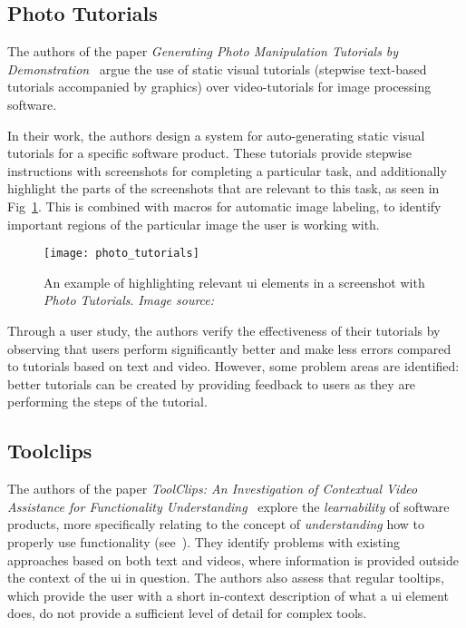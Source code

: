 \subsection{Photo Tutorials}
\label{sec:photo_tutorials}
The authors of the paper \emph{Generating Photo Manipulation Tutorials by Demonstration}~\cite{grabler:photo_tutorials} argue the use of static visual tutorials (stepwise text-based tutorials accompanied by graphics) over video-tutorials for image processing software.

\noindent
In their work, the authors design a system for auto-generating static visual tutorials for a specific software product. These tutorials provide stepwise instructions with screenshots for completing a particular task, and additionally highlight the parts of the screenshots that are relevant to this task, as seen in Fig~\ref{fig:photo_tutorials}. This is combined with macros for automatic image labeling, to identify important regions of the particular image the user is working with.

\begin{figure}[htp]
	\centering
	\texttt{[image: photo\_tutorials]}
	\caption[\emph{Photo Tutorials} example]{An example of highlighting relevant \gls{ui} elements in a screenshot with \emph{Photo Tutorials}. \emph{Image source:~\cite{grabler:photo_tutorials}}}
	\label{fig:photo_tutorials}
\end{figure}

\noindent
Through a user study, the authors verify the effectiveness of their tutorials by observing that users perform significantly better and make less errors compared to tutorials based on text and video. However, some problem areas are identified: better tutorials can be created by providing feedback to users as they are performing the steps of the tutorial.

\subsection{Toolclips}
\label{sec:toolclips}
The authors of the paper \emph{ToolClips: An Investigation of Contextual
Video Assistance for Functionality Understanding}~\cite{grossman:toolclips} explore the \emph{learnability} of software products, more specifically relating to the concept of \emph{understanding} how to properly use functionality (see~\cite{grossman:software_learnability}). They identify problems with existing approaches based on both text and videos, where information is provided outside the context of the \gls{ui} in question. The authors also assess that regular tooltips, which provide the user with a short in-context description of what a \gls{ui} element does, do not provide a sufficient level of detail for complex tools.

